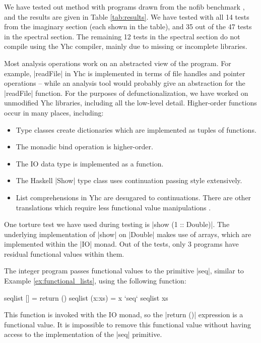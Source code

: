 \documentclass[preprint]{sigplanconf}
\begin{document}
We have tested out method with programs drawn from the nofib benchmark \cite{nofib}, and the results are given in Table \ref{tab:results}. We have tested with all 14 tests from the imaginary section (each shown in the table), and 35 out of the 47 tests in the spectral section. The remaining 12 tests in the spectral section do not compile using the Yhc compiler, mainly due to missing or incomplete libraries.

Most analysis operations work on an abstracted view of the program. For example, |readFile| in Yhc is implemented in terms of file handles and pointer operations -- while an analysis tool would probably give an abstraction for the |readFile| function. For the purposes of defunctionalization, we have worked on unmodified Yhc libraries, including all the low-level detail. Higher-order functions occur in many places, including:

\begin{itemize}
\item Type classes create dictionaries which are implemented as tuples of functions.
\item The monadic bind operation is higher-order.
\item The IO data type is implemented as a function.
\item The Haskell |Show| type class uses continuation passing style extensively.
\item List comprehensions in Yhc are desugared to continuations. There are other translations which require less functional value manipulations \cite{wadler:list_comprehensions,coutts:stream_fusion}.
\end{itemize}

One torture test we have used during testing is |show (1 :: Double)|. The underlying implementation of |show| on |Double| makes use of arrays, which are implemented within the |IO| monad. Out of the tests, only 3 programs have residual functional values within them.

The integer program passes functional values to the primitive |seq|, similar to Example \ref{ex:functional_lists}, using the following function:

\begin{code}
seqlist [] = return ()
seqlist (x:xs) = x `seq` seqlist xs
\end{code}

This function is invoked with the IO monad, so the |return ()| expression is a functional value. It is impossible to remove this functional value without having access to the implementation of the |seq| primitive.
\end{document}
